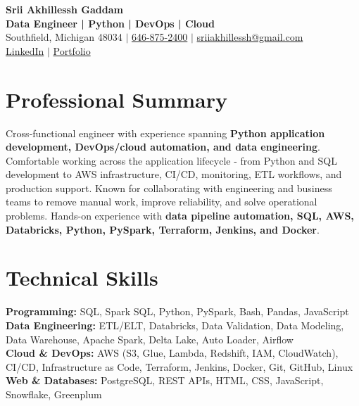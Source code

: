 \documentclass[letterpaper,10pt]{article}
\begin{document}
\fontsize{9.35pt}{10.45pt}\selectfont

\begin{center}
    {\LARGE \textbf{Srii Akhillessh Gaddam}} \\[-1pt]
    \textbf{Data Engineer | Python | DevOps | Cloud} \\[2pt]
    Southfield, Michigan 48034 $|$
    \href{tel:6468752400}{646-875-2400} $|$
    \href{mailto:sriiakhillessh@gmail.com}{sriiakhillessh@gmail.com} \\[1pt]
    \href{https://www.linkedin.com/in/srii-akhiilessh-gaddam-b48668191/}{LinkedIn} $|$
    \href{https://sriiakhillesshg.github.io/portfolio/}{Portfolio}
\end{center}
\vspace{-8pt}

\section{Professional Summary}
\small{Cross-functional engineer with experience spanning \textbf{Python application development, DevOps/cloud automation, and data engineering}. Comfortable working across the application lifecycle - from Python and SQL development to AWS infrastructure, CI/CD, monitoring, ETL workflows, and production support. Known for collaborating with engineering and business teams to remove manual work, improve reliability, and solve operational problems. Hands-on experience with \textbf{data pipeline automation, SQL, AWS, Databricks, Python, PySpark, Terraform, Jenkins, and Docker}.}

\section{Technical Skills}
\small{
\textbf{Programming:} SQL, Spark SQL, Python, PySpark, Bash, Pandas, JavaScript \\
\textbf{Data Engineering:} ETL/ELT, Databricks, Data Validation, Data Modeling, Data Warehouse, Apache Spark, Delta Lake, Auto Loader, Airflow \\
\textbf{Cloud \& DevOps:} AWS (S3, Glue, Lambda, Redshift, IAM, CloudWatch), CI/CD, Infrastructure as Code, Terraform, Jenkins, Docker, Git, GitHub, Linux \\
\textbf{Web \& Databases:} PostgreSQL, REST APIs, HTML, CSS, JavaScript, Snowflake, Greenplum
}
\end{document}
